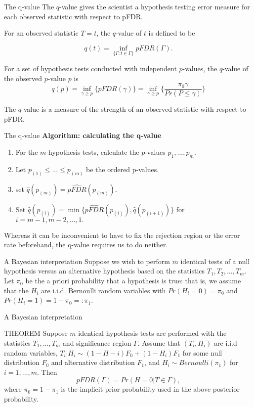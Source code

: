 \documentclass{beamer}
\begin{document}
\begin{frame}[t]{The q-value}\vspace{10pt}
The $q$-value gives the scientist a hypothesis testing error measure for each observed statistic with respect to pFDR.

For an observed statistic $T = t$, the $q$-value of $t$ is defined to be

$$ q(t) = \inf_{\{\Gamma:t\in\Gamma\}}{pFDR(\Gamma)}.$$


For a set of hypothesis tests conducted with independent $p$-values, the $q$-value
of the observed $p$-value $p$ is
$$ q(p) = \inf_{\gamma \geq p}\{pFDR(\gamma)\} = \inf_{\gamma \geq p} \{\frac{\pi_0\gamma}{Pr(P \leq \gamma)}\} $$

The $q$-value is a measure of the strength of an observed statistic with respect to pFDR.
\end{frame}

\begin{frame}[t]{The q-value}\vspace{10pt}
\textbf{Algorithm: calculating the q-value}
\begin{enumerate}
	\item For the $m$ hypothesis tests, calculate the $p$-values $p_1,...,p_m$.
	\item Let $p_{(1)} \leq ...\leq p_{(m)}$ be the ordered p-values.
	\item set $\hat{q}(p_{(m)}) = \hat{pFDR}(p_{(m)})$.
	\item Set $\hat{q}(p_{(i)}) = \min\{\hat{pFDR}(p_{(i)}),\hat{q}(p_{(i+1)})\}$ for $i =m-1,m-2,...,1. $
\end{enumerate}
Whereas it can be inconvenient to have to fix the rejection region or the error rate beforehand, the q-value requires us to do neither.
\end{frame}

\begin{frame}[t]{A Bayesian interpretation}\vspace{10pt}
Suppose we wish to perform $m$ identical tests of a null hypothesis versus an alternative hypothesis based on the statistics $T_1,T_2, . . .,T_m$. Let $\pi_0$ be
the a priori probability that a hypothesis is true: that is, we assume that the $H_i$ are i.i.d. Bernoulli random variables with $Pr(H_i = 0) = \pi_0$ and $Pr(H_i = 1) = 1-\pi_0 =: \pi_1$.
\end{frame}

\begin{frame}[t]{A Bayesian interpretation}\vspace{10pt}
\begin{block}{THEOREM}
	Suppose $m$ identical hypothesis tests are performed with the statistics $T_1,...,T_m$ and significance region $\Gamma$. Assume that $(T_i,H_i)$ are i.i.d random variables, $T_i|H_i \sim (1-H-i)F_0+(1-H_i)F_1$ for some null distribution $F_0$ and alternative distribution $F_1$, and $H_i\sim Bernoulli(\pi_1)$ for $i=1,...,m$. Then 
	$$ pFDR(\Gamma) = Pr(H=0|T\in\Gamma),$$
	where $\pi_0 = 1- \pi_1$ is the implicit prior probability used in the above posterior probability.
\end{block}
\end{frame}
\end{document}
